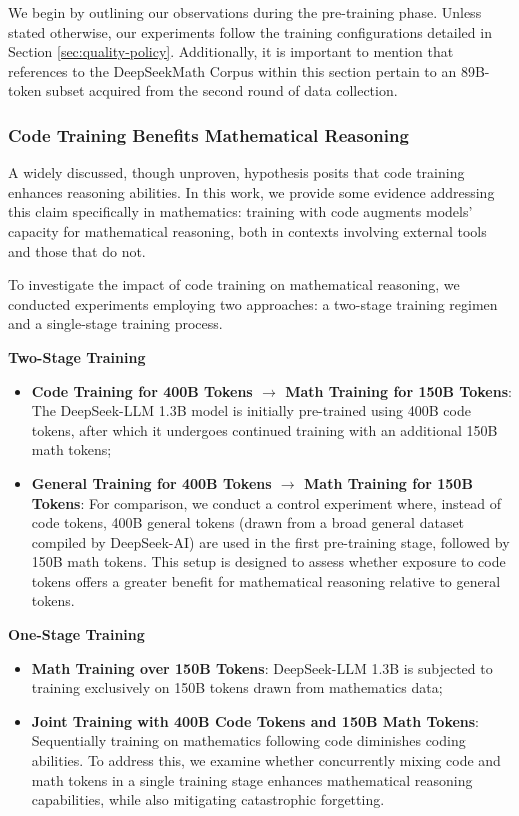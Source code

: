 \begin{itemize}[topsep=0pt]
We begin by outlining our observations during the pre-training phase. Unless stated otherwise, our experiments follow the training configurations detailed in Section \ref{sec:quality-policy}. Additionally, it is important to mention that references to the DeepSeekMath Corpus within this section pertain to an 89B-token subset acquired from the second round of data collection.

\subsubsection{Code Training Benefits Mathematical Reasoning}

A widely discussed, though unproven, hypothesis posits that code training enhances reasoning abilities. In this work, we provide some evidence addressing this claim specifically in mathematics: training with code augments models' capacity for mathematical reasoning, both in contexts involving external tools and those that do not.

To investigate the impact of code training on mathematical reasoning, we conducted experiments employing two approaches: a two-stage training regimen and a single-stage training process.

\textbf{Two-Stage Training}

\begin{itemize}[topsep=0pt]
    \item \textbf{Code Training for 400B Tokens $\rightarrow$ Math Training for 150B Tokens}: The DeepSeek-LLM 1.3B model is initially pre-trained using 400B code tokens, after which it undergoes continued training with an additional 150B math tokens;
    \item \textbf{General Training for 400B Tokens $\rightarrow$ Math Training for 150B Tokens}: For comparison, we conduct a control experiment where, instead of code tokens, 400B general tokens (drawn from a broad general dataset compiled by DeepSeek-AI) are used in the first pre-training stage, followed by 150B math tokens. This setup is designed to assess whether exposure to code tokens offers a greater benefit for mathematical reasoning relative to general tokens.
\end{itemize}

\textbf{One-Stage Training}

\begin{itemize}[topsep=0pt]
    \item \textbf{Math Training over 150B Tokens}: DeepSeek-LLM 1.3B is subjected to training exclusively on 150B tokens drawn from mathematics data;
    \item \textbf{Joint Training with 400B Code Tokens and 150B Math Tokens}: Sequentially training on mathematics following code diminishes coding abilities. To address this, we examine whether concurrently mixing code and math tokens in a single training stage enhances mathematical reasoning capabilities, while also mitigating catastrophic forgetting.
\end{itemize}


\end{itemize}
